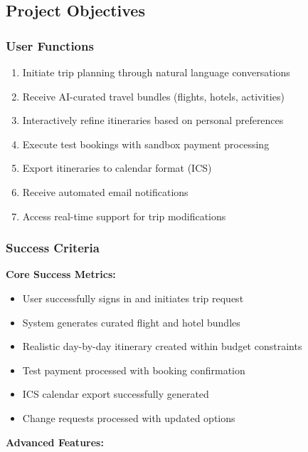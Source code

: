 \documentclass[12pt,a4paper]{article}
\begin{document}
\subsection{Project Objectives}

\subsubsection{User Functions}

\begin{enumerate}[leftmargin=*, itemsep=0.3em]
    \item Initiate trip planning through natural language conversations
    \item Receive AI-curated travel bundles (flights, hotels, activities)
    \item Interactively refine itineraries based on personal preferences
    \item Execute test bookings with sandbox payment processing
    \item Export itineraries to calendar format (ICS)
    \item Receive automated email notifications
    \item Access real-time support for trip modifications
\end{enumerate}

\subsubsection{Success Criteria}

\begin{highlightbox}
\textbf{Core Success Metrics:}
\begin{itemize}[leftmargin=*, itemsep=0.3em]
    \item User successfully signs in and initiates trip request
    \item System generates curated flight and hotel bundles
    \item Realistic day-by-day itinerary created within budget constraints
    \item Test payment processed with booking confirmation
    \item ICS calendar export successfully generated
    \item Change requests processed with updated options
\end{itemize}
\end{highlightbox}

\textbf{Advanced Features:}
\end{document}
